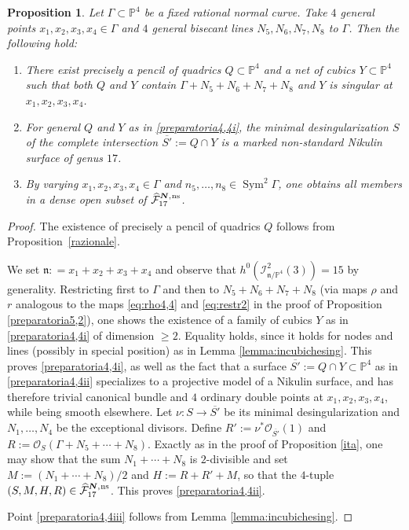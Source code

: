 \documentclass[11pt]{article}
\newcommand{\ns}{{\mkern1mu\mathrm{ns}}}
\newcommand{\bN}{\boldsymbol{N}}
\theoremstyle{plain}
\newtheorem{prop}[thm]{Proposition}
\theoremstyle{definition}
\DeclareMathOperator{\Sym}{Sym}
\newcommand\PP{{\mathbb P}}
\newcommand\F{{\mathcal F}}
\begin{document}
\begin{prop}\label{preparatoria4,4}
Let $\Gamma\subset\PP^4$ be a fixed rational normal curve. Take $4$ general points $x_1,x_2,x_3,x_4\in \Gamma$ and $4$ general bisecant lines $N_5,N_6,N_7,N_8$ to $\Gamma$. Then the following hold:
\begin{enumerate}
\item\label{preparatoria4,4i}
There exist precisely a pencil of quadrics $Q \subset\mathbb P^4$ and a net of cubics $Y\subset\mathbb P^4$ such that both $Q$ and $Y$ contain $\Gamma+N_5+N_6+N_7+N_8$ and $Y$ is singular at $x_1,x_2,x_3,x_4$.
\item\label{preparatoria4,4ii}
For general $Q$ and $Y$ as in \eqref{preparatoria4,4i}, the minimal desingularization $S$ of the complete intersection $\overline{S'}:= Q\cap Y$ is a marked non-standard Nikulin surface of genus $17$.
\item\label{preparatoria4,4iii}
By varying $x_1,x_2,x_3,x_4\in \Gamma$ and $n_5,\ldots,n_8\in \Sym^2\Gamma$, one obtains all members in a dense open subset of $\widehat{\F}_{17}^{\bN,\ns}$.
\end{enumerate}
\end{prop}

\begin{proof}
The existence of precisely a pencil of quadrics $Q$ follows from Proposition~\ref{razionale}.

We set $\mathfrak{n}: = x_1 + x_2 + x_3 + x_4$ and observe that $h^0(\mathcal I^2_{\mathfrak{n}/\PP^4}(3))=15$ by generality. Restricting first to $\Gamma$ and then to $N_5+N_6+N_7+N_8$ (via maps $\rho$ and $r$ analogous to the maps \eqref{eq:rho4,4} and \eqref{eq:restr2} in the proof of Proposition \ref{preparatoria5,2}), one shows the existence of a family of cubics $Y$ as in \eqref{preparatoria4,4i} of dimension $\geq 2$. Equality holds, since it holds for nodes and lines (possibly in special position) as in Lemma \ref{lemma:incubichesing}. This proves \eqref{preparatoria4,4i}, as well as the fact that a surface $\overline{S'}:= Q\cap Y\subset \PP^4$ as in \eqref{preparatoria4,4ii} specializes to a projective model of a Nikulin surface, and has therefore trivial canonical bundle and $4$ ordinary double points at $x_1,x_2,x_3,x_4$, while being smooth elsewhere. Let $\nu:S\to \overline{S'}$ be its minimal desingularization and $N_1,\ldots,N_4$ be the exceptional divisors. Define $R':=\nu^*\mathcal O_{\overline{S'}}(1)$ and $R:=\mathcal{O}_{S}(\Gamma+N_5+\cdots+N_8)$. Exactly as in the proof of Proposition \ref{ita}, one may show that the sum $N_1+\cdots +N_8$ is $2$-divisible and set $M:=(N_1+\cdots +N_8)/2$ and $H:=R+R'+M$, so that the $4$-tuple $(S,M,H,R)\in \widehat{\F}_{17}^{\bN,\ns}$.
This proves \eqref{preparatoria4,4ii}.

Point \eqref{preparatoria4,4iii} follows from Lemma \ref{lemma:incubichesing}.
\end{proof}
\end{document}

